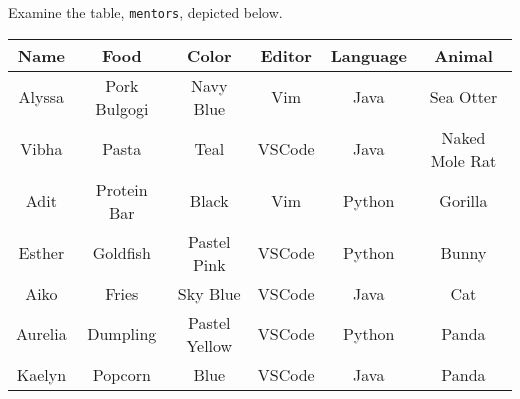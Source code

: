 Examine the table, \texttt{mentors}, depicted below.

\begin{center}
\begin{tabular}{|c|c|c|c|c|c|}
 \hline
 \textbf{Name} & \textbf{Food} & \textbf{Color} & \textbf{Editor} & \textbf{Language} & \textbf{Animal}\\
 \hline
 Alyssa & Pork Bulgogi & Navy Blue & Vim & Java & Sea Otter\\
 \hline
 Vibha & Pasta & Teal & VSCode & Java & Naked Mole Rat\\
 \hline
 Adit & Protein Bar & Black & Vim & Python & Gorilla\\
 \hline
 Esther & Goldfish & Pastel Pink & VSCode & Python & Bunny\\
 \hline
 Aiko & Fries & Sky Blue & VSCode & Java & Cat\\
 \hline
 Aurelia & Dumpling & Pastel Yellow & VSCode & Python & Panda\\
 \hline
 Kaelyn & Popcorn & Blue & VSCode & Java & Panda\\
 \hline
\end{tabular}
\end{center}
